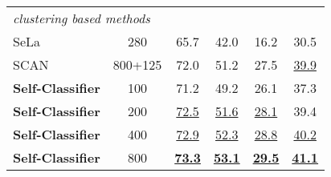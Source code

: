 \documentclass[runningheads]{llncs}
\begin{document}
\begin{table}[bt]
\begin{tabular}{lccccc}
    \midrule
    \midrule
    \multicolumn{6}{l}{\textit{clustering based methods}}\\
    SeLa \cite{YM.2020Self-labelling} & 280 & 65.7 & 42.0 & 16.2 & 30.5 \\
    SCAN \cite{van2020scan} & 800+125 & 72.0 & 51.2 & 27.5 & \underline{39.9} \\
    \midrule
    \textbf{Self-Classifier} & 100 & 71.2 & 49.2 & 26.1 & 37.3 \\
    \textbf{Self-Classifier} & 200 & \underline{72.5} & \underline{51.6} & \underline{28.1} & 39.4 \\
    \textbf{Self-Classifier} & 400 & \underline{72.9} & \underline{52.3} & \underline{28.8} & \underline{40.2} \\
    \textbf{Self-Classifier} & 800 & \underline{\textbf{73.3}} & \underline{\textbf{53.1}} & \underline{\textbf{29.5}} & \underline{\textbf{41.1}} \\
    \bottomrule
  \end{tabular}
\end{table}
\end{document}
